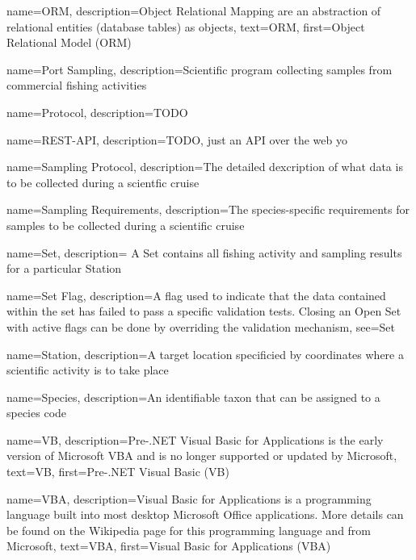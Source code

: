  {
    name=ORM,
    description={Object Relational Mapping are an abstraction of relational entities (database tables) as objects},
    text={ORM},
    first={Object Relational Model (ORM)}
}

 {
    name=Port Sampling,
    description={Scientific program collecting samples from commercial fishing activities}
}

 {
    name=Protocol,
    description={TODO}
}

 {
    name=REST-API,
    description={TODO, just an API over the web yo}
}

 {
    name=Sampling Protocol,
    description={The detailed dexcription of what data is to be collected during a scientfic cruise}
}

 {
    name=Sampling Requirements,
    description={The species-specific requirements for samples to be collected during a scientific cruise}
}

 {
    name=Set,
    description={
        A Set contains all fishing activity and sampling results for a particular \gls{Station}
    }
}

 {
    name=Set Flag,
    description={A flag used to indicate that the data contained within the set has failed to pass a specific validation tests.
    Closing an \gls{Open Set} with active flags can be done by overriding the validation mechanism},
    see=\gls{Set}
}

 {
    name=Station,
    description={A target location specificied by coordinates where a scientific activity is to take place}
}

 {
    name=Species,
    description={An identifiable taxon that can be assigned to a species code}
}

 {
    name=VB,
    description={Pre-.NET Visual Basic for Applications is the early version of Microsoft VBA and is no longer supported or updated by Microsoft},
    text={VB},
    first={Pre-.NET Visual Basic (VB)}
}

 {
    name=VBA,
    description={Visual Basic for Applications is a programming language built into most desktop Microsoft Office applications. More details can be found on the Wikipedia page for this programming language and from Microsoft},
    text={VBA},
    first={Visual Basic for Applications (VBA)}
}

